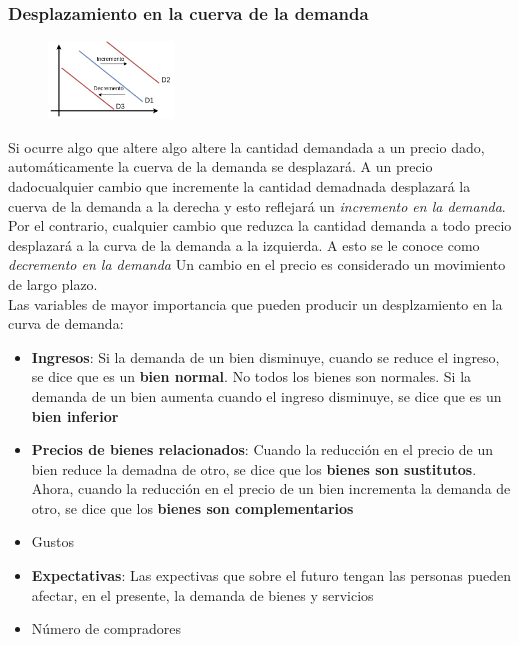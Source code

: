 \subsubsection{Desplazamiento en la cuerva de la demanda}
\begin{figure} %
    \centering
    \includegraphics[width=0.3\textwidth]{images/demand1.png}
\end{figure}

Si ocurre algo que altere algo altere la cantidad demandada a un precio dado, automáticamente la cuerva de la demanda se desplazará. A un precio dadocualquier cambio que incremente la cantidad demadnada desplazará la cuerva de la demanda a la derecha y esto reflejará un \textit{incremento en la demanda}. Por el contrario, cualquier cambio que reduzca la cantidad demanda a todo precio desplazará a la curva de la demanda a la izquierda. A esto se le conoce como \textit{decremento en la demanda} Un cambio en el precio es considerado un movimiento de {largo plazo}.\\

Las variables de mayor importancia que pueden producir un desplzamiento en la curva de demanda:
\begin{itemize}
\item{{\bf Ingresos}: Si la demanda de un bien disminuye, cuando se reduce el ingreso, se dice que es un {\bf bien normal}. No todos los bienes son normales. Si la demanda de un bien aumenta cuando el ingreso disminuye, se dice que es un {\bf bien inferior}}
\item{{\bf Precios de bienes relacionados}: Cuando la reducción en el precio de un bien reduce la demadna de otro, se dice que los {\bf bienes son sustitutos}. Ahora, cuando la reducción en el precio de un bien incrementa la demanda de otro, se dice que los {\bf bienes son complementarios}}
\item{Gustos}
\item{{\bf Expectativas}: Las expectivas que sobre el futuro tengan las personas pueden afectar, en el presente, la demanda de bienes y servicios}
\item{Número de compradores}
\end{itemize}

